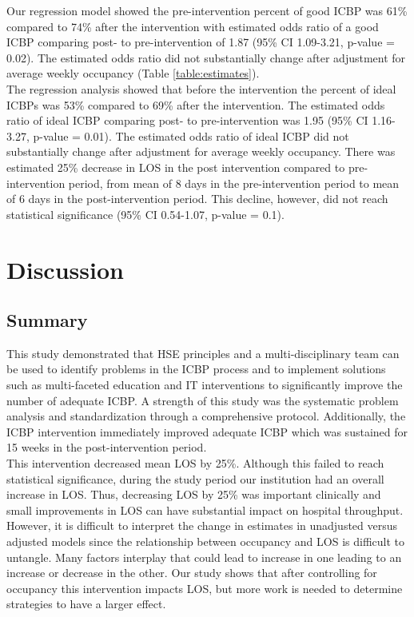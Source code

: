 \documentclass[Bprep]{subfiles}
\begin{document}
Our regression model showed the pre-intervention percent of good ICBP was 61\% compared to 74\% after the intervention with estimated odds ratio of a good ICBP comparing post- to pre-intervention of 1.87 (95\% CI 1.09-3.21, p-value = 0.02). The estimated odds ratio did not substantially change after adjustment for average weekly occupancy (Table \ref{table:estimates}).\\

The regression analysis showed that before the intervention the percent of ideal ICBPs was 53\% compared to 69\% after the intervention. The estimated odds ratio of ideal ICBP comparing post- to pre-intervention was 1.95 (95\% CI 1.16-3.27, p-value = 0.01). The estimated odds ratio of ideal ICBP did not substantially change after adjustment for average weekly occupancy. There was estimated 25\% decrease in LOS in the post intervention compared to pre-intervention period, from mean of 8 days in the pre-intervention period to mean of 6 days in the post-intervention period. This decline, however,
did not reach statistical significance (95\% CI 0.54-1.07, p-value = 0.1).\\



\section{Discussion}
\hypertarget{Discussion}{}
\subsection{Summary}\label{subsec:Summary}
\hypertarget{Summary}{}

This study demonstrated that HSE principles and a multi-disciplinary team can be used to identify problems in the ICBP process and to implement solutions such as multi-faceted education and IT interventions to significantly improve the number of adequate ICBP. A strength of this study was the systematic problem analysis and standardization through a comprehensive protocol. Additionally, the ICBP intervention immediately improved adequate ICBP which was sustained for 15 weeks in the post-intervention period.\\

This intervention decreased mean LOS by 25\%. Although this failed to reach statistical significance, during the study period our institution had an overall increase in LOS. Thus, decreasing LOS by 25\% was important clinically and small improvements in LOS can have substantial impact on hospital throughput. However, it is difficult to interpret the change in estimates in unadjusted versus adjusted models since the relationship between occupancy and LOS is difficult to untangle. Many factors interplay that could lead to increase in one leading to an increase or decrease in the other. Our study shows that after controlling for occupancy this intervention impacts LOS, but more work is needed to determine strategies to have a larger effect.\\
\end{document}
